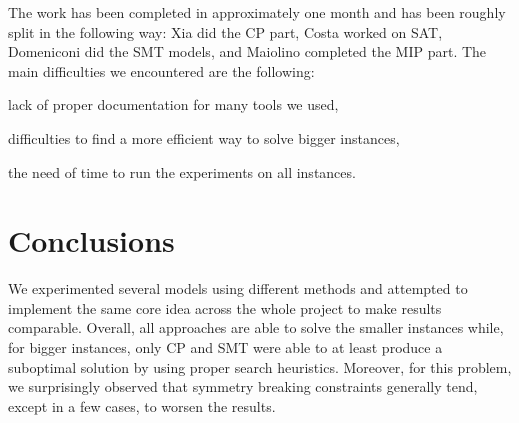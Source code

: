 \documentclass{article}
\begin{document}
    The work has been completed in approximately one month and has been roughly split in the following way: Xia did the CP part, Costa worked on SAT, Domeniconi did the SMT models, and Maiolino completed the MIP part. The main difficulties we encountered are the following: 
    \begin{enumerate*}[label=(\roman*)]
        \item lack of proper documentation for many tools we used,
        \item difficulties to find a more efficient way to solve bigger instances,
        \item the need of time to run the experiments on all instances.
    \end{enumerate*}


    
    
    
    


    \section{Conclusions}

    We experimented several models using different methods and attempted to implement the same core idea across the whole project to make results comparable. Overall, all approaches are able to solve the smaller instances while, for bigger instances, only CP and SMT were able to at least produce a suboptimal solution by using proper search heuristics. Moreover, for this problem, we surprisingly observed that symmetry breaking constraints generally tend, except in a few cases, to worsen the results.

    \printbibliography
\end{document}
